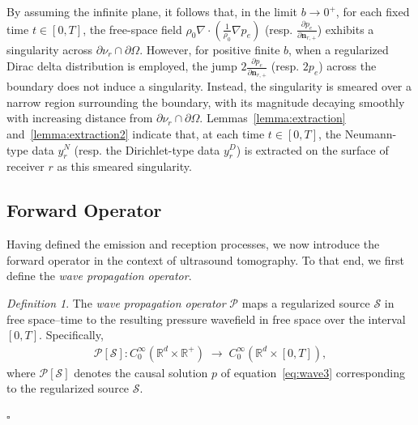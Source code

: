 \documentclass[11pt,reqno]{amsart}
\theoremstyle{remark}
\newtheorem{definition}{Definition}
\theoremstyle{italic_lemma}
\newcommand{\bn}{\boldsymbol{n}}
\begin{document}
\noindent
By assuming the infinite plane, it follows that, in the limit $b \rightarrow 0^+$, for each fixed time $t \in [0,T]$, the free-space field 
\(\rho_0 \nabla \cdot \left( \frac{1}{\rho_0} \nabla p_e \right)\) (resp. \(\frac{\partial p_e}{\partial \bn_{r,+}}\)) exhibits a singularity across $\partial \nu_r \cap \partial \Omega$. However, for positive finite $b$, when a regularized Dirac delta distribution is employed, the jump \(2\frac{\partial p_e}{\partial \bn_{r,+}}\) (resp. \(2 p_e \)) across the boundary does not induce a singularity. Instead, the singularity is smeared over a narrow region surrounding the boundary, with its magnitude decaying smoothly with increasing distance from $\partial \nu_r \cap \partial \Omega$. Lemmas~\ref{lemma:extraction} and~\ref{lemma:extraction2} indicate that, at each time $t \in [0, T]$, the Neumann-type data $y_r^N$ (resp. the Dirichlet-type data $y_r^D$) is extracted on the surface of receiver $r$ as this smeared singularity.


\subsection{Forward Operator}

Having defined the emission and reception processes, we now introduce the forward operator in the context of ultrasound tomography. To that end, we first define the \emph{wave propagation operator}.

\begin{definition} \label{def:wave-propagation-operator}
The \textit{wave propagation operator} \(\mathcal{P}\) maps a regularized 
source \(\mathcal{S}\) in free space--time to the resulting pressure wavefield 
in free space over the interval \([0,T]\). Specifically,
\begin{align} \label{eq:wave-map}
\mathcal{P}[\mathcal{S}]: C_0^{\infty}\!\left( \mathbb{R}^d \times \mathbb{R}^+ \right) 
\;\longrightarrow\; C_0^{\infty}\!\left( \mathbb{R}^d \times [0,T] \right),
\end{align}
where \(\mathcal{P}[\mathcal{S}]\) denotes the causal solution \(p\) of 
equation~\eqref{eq:wave3} corresponding to the regularized source \(\mathcal{S}\).
\end{definition}
\hfill \(\square\)
\end{document}

